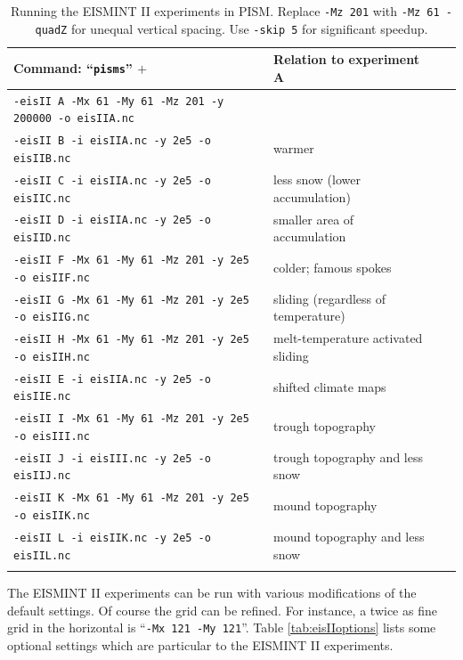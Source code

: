 \documentclass[11pt,final]{amsart}
\renewcommand{\t}[1]{\texttt{#1}}
\begin{document}
\begin{table}[ht]
\caption{Running the EISMINT II experiments in PISM.  Replace \t{-Mz 201} with \t{-Mz 61 -quadZ} for unequal vertical spacing.  Use \t{-skip 5} for significant speedup.}\label{tab:eisII}
\small
\begin{tabular}{@{}llll}\hline
\textbf{Command: ``\t{pisms}'' $+$} & \textbf{Relation to experiment A} \\ \hline
\verb|-eisII A -Mx 61 -My 61 -Mz 201 -y 200000 -o eisIIA.nc| & \\
\verb|-eisII B -i eisIIA.nc -y 2e5 -o eisIIB.nc| & warmer \\
\verb|-eisII C -i eisIIA.nc -y 2e5 -o eisIIC.nc| & less snow (lower accumulation)\\
\verb|-eisII D -i eisIIA.nc -y 2e5 -o eisIID.nc| & smaller area of accumulation \\
\verb|-eisII F -Mx 61 -My 61 -Mz 201 -y 2e5 -o eisIIF.nc| & colder; famous spokes \cite{BBL} \\
\verb|-eisII G -Mx 61 -My 61 -Mz 201 -y 2e5 -o eisIIG.nc| & sliding (regardless of temperature) \\
\verb|-eisII H -Mx 61 -My 61 -Mz 201 -y 2e5 -o eisIIH.nc| & melt-temperature activated sliding \\ \hline
\verb|-eisII E -i eisIIA.nc -y 2e5 -o eisIIE.nc| & shifted climate maps \\
\verb|-eisII I -Mx 61 -My 61 -Mz 201 -y 2e5 -o eisIII.nc| & trough topography \\
\verb|-eisII J -i eisIII.nc -y 2e5 -o eisIIJ.nc| & trough topography and less snow \\
\verb|-eisII K -Mx 61 -My 61 -Mz 201 -y 2e5 -o eisIIK.nc| & mound topography \\
\verb|-eisII L -i eisIIK.nc -y 2e5 -o eisIIL.nc| & mound topography and less snow \\
\hline\normalsize
\end{tabular}\end{table}

The EISMINT II experiments can be run with various modifications of the default settings.  Of course the grid can be refined.  For instance, a twice as fine grid in the horizontal is ``\t{-Mx 121 -My 121}''.  Table \ref{tab:eisIIoptions} lists some optional settings which are particular to the EISMINT II experiments.
\end{document}
